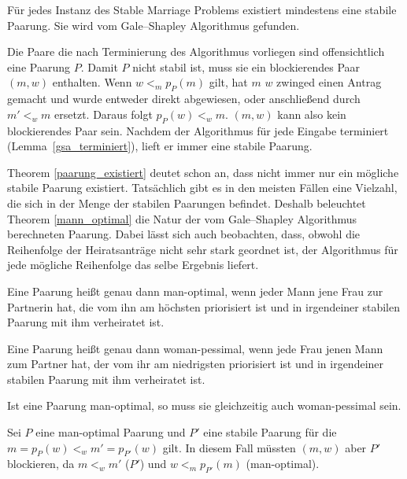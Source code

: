 \begin{Theorem}
\label{paarung_existiert}
  Für jedes Instanz des Stable Marriage Problems existiert mindestens eine stabile Paarung. Sie wird vom Gale–Shapley Algorithmus gefunden.
\end{Theorem}

\begin{Beweis}
\label{paarung_existiert_bew}
  Die Paare die nach Terminierung des Algorithmus vorliegen sind offensichtlich eine Paarung $P$. Damit $P$ nicht stabil ist, muss sie ein blockierendes Paar $(m,w)$ enthalten. Wenn $w <_{m} p_{P}(m)$ gilt, hat $m$ $w$ zwinged einen Antrag gemacht und wurde entweder direkt abgewiesen, oder anschließend durch $m' <_{w} m$ ersetzt. Daraus folgt $p_{P}(w) <_{w} m$. $(m,w)$ kann also kein blockierendes Paar sein. Nachdem der Algorithmus für jede Eingabe terminiert (Lemma~\ref{gsa_terminiert}), lieft er immer eine stabile Paarung.
\end{Beweis}

Theorem \ref{paarung_existiert} deutet schon an, dass nicht immer nur ein mögliche stabile Paarung existiert. Tatsächlich gibt es in den meisten Fällen eine Vielzahl, die sich in der Menge der stabilen Paarungen befindet. Deshalb beleuchtet Theorem \ref{mann_optimal} die Natur der vom Gale–Shapley Algorithmus berechneten Paarung. Dabei lässt sich auch beobachten, dass, obwohl die Reihenfolge der Heiratsanträge nicht sehr stark geordnet ist, der Algorithmus für jede mögliche Reihenfolge das selbe Ergebnis liefert.

\begin{Definition}
\label{man_optimal}
  Eine Paarung heißt genau dann man-optimal, wenn jeder Mann jene Frau zur Partnerin hat, die vom ihn am höchsten priorisiert ist und in irgendeiner stabilen Paarung mit ihm verheiratet ist.
\end{Definition}

\begin{Definition}
\label{woman_pessimal}
  Eine Paarung heißt genau dann woman-pessimal, wenn jede Frau jenen Mann zum Partner hat, der vom ihr am niedrigsten priorisiert ist und in irgendeiner stabilen Paarung mit ihm verheiratet ist.
\end{Definition}

\begin{Lemma}
\label{man_optimal_woman_pessimal}
  Ist eine Paarung man-optimal, so muss sie gleichzeitig auch woman-pessimal sein.
\end{Lemma}

\begin{Beweis}
\label{man_optimal_woman_pessimal_bew}
  Sei $P$ eine man-optimal Paarung und $P'$ eine stabile Paarung für die $m = p_{P}(w) <_{w} m' = p_{P'}(w)$ gilt. In diesem Fall müssten $(m,w)$ aber $P'$ blockieren, da $m <_{w} m'$ ($P'$) und $w <_{m} p_{P'}(m)$ (man-optimal).
\end{Beweis}

